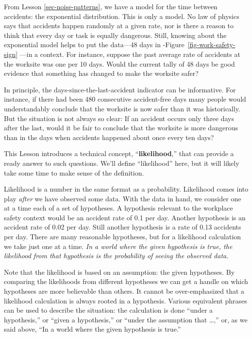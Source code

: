 \documentclass[
  letterpaper,
  DIV=11,
  numbers=noendperiod,
  oneside]{scrartcl}
\begin{document}
From Lesson \ref{sec-noise-patterns}, we have a model for the time
between accidents: the exponential distribution. This is only a model.
No law of physics says that accidents happen randomly at a given rate,
nor is there a reason to think that every day or task is equally
dangerous. Still, knowing about the exponential model helps to put the
data---48 days in -Figure~\ref{fig-work-safety-sign} ---in a context.
For instance, suppose the past average rate of accidents at the worksite
was one per 10 days. Would the current tally of 48 days be good evidence
that something has changed to make the worksite safer?

In principle, the days-since-the-last-accident indicator can be
informative. For instance, if there had been 480 consecutive
accident-free days many people would understandably conclude that the
worksite is now safer than it was historically. But the situation is not
always so clear: If an accident occurs only three days after the last,
would it be fair to conclude that the worksite is more dangerous than in
the days when accidents happened about once every ten days?

This Lesson introduces a technical concept, ``\textbf{likelihood},''
that can provide a ready answer to such questions. We'll define
``likelihood'' here, but it will likely take some time to make sense of
the definition.

Likelihood is a number in the same format as a probability. Likelihood
comes into play \emph{after} we have observed some data. With the data
in hand, we consider one at a time each of a set of hypotheses. A
hypothesis relevant to the workplace safety context would be an accident
rate of 0.1 per day. Another hypothesis is an accident rate of 0.02 per
day. Still another hypothesis is a rate of 0.13 accidents per day. There
are many reasonable hypotheses, but for a likelihood calculation we take
just one at a time. \emph{In a world where the given hypothesis is true,
the likelihood from that hypothesis is the probability of seeing the
observed data.}

Note that the likelihood is based on an assumption: the given
hypotheses. By comparing the likelihoods from different hypotheses we
can get a handle on which hypotheses are more believable than others. It
cannot be over-emphasized that a likelihood calculation is always rooted
in a hypothesis. Various equivalent phrases can be used to describe the
situation: the calculation is done ``under a hypothesis,'' or ``given a
hypothesis,'' or ``under the assumption that \ldots,'' or, as we said
above, ``In a world where the given hypothesis is true.''
\end{document}
